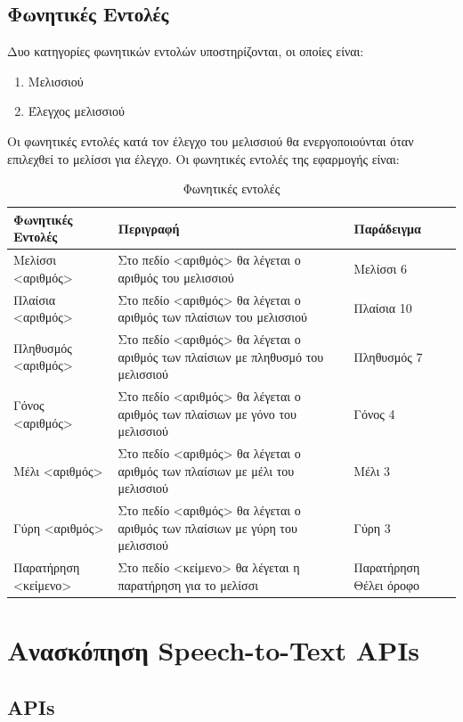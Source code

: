 \documentclass[oneside, 12pt]{book}
\begin{document}
\section{Φωνητικές Εντολές}
\label{sec:φωνητικές-εντολές}
Δυο κατηγορίες φωνητικών εντολών υποστηρίζονται, οι οποίες είναι:
\begin{enumerate}
  \item Μελισσιού
  \item Έλεγχος μελισσιού
\end{enumerate}
Οι φωνητικές εντολές κατά τον έλεγχο του μελισσιού θα ενεργοποιούνται όταν επιλεχθεί το μελίσσι για έλεγχο.
Οι φωνητικές εντολές της εφαρμογής είναι:
\begin{table}[h]
  \centering
  \caption{Φωνητικές εντολές}
  \begin{tabularx}{\linewidth}[h]{|X|X|X|}
    \hline
    Φωνητικές Εντολές & Περιγραφή & Παράδειγμα \\
    \hline
    \hline
    Μελίσσι <αριθμός> & Στο πεδίο <αριθμός> θα λέγεται ο αριθμός του μελισσιού & Μελίσσι 6 \\
    \hline
    Πλαίσια <αριθμός> & Στο πεδίο <αριθμός> θα λέγεται ο αριθμός των πλαίσιων του μελισσιού & Πλαίσια 10 \\
    \hline
    Πληθυσμός <αριθμός> & Στο πεδίο <αριθμός> θα λέγεται ο αριθμός των πλαίσιων με πληθυσμό του μελισσιού & Πληθυσμός 7 \\
    \hline
    Γόνος <αριθμός> & Στο πεδίο <αριθμός> θα λέγεται ο αριθμός των πλαίσιων με γόνο του μελισσιού & Γόνος 4 \\
    \hline
    Μέλι <αριθμός> & Στο πεδίο <αριθμός> θα λέγεται ο αριθμός των πλαίσιων με μέλι του μελισσιού & Μέλι 3 \\
    \hline
    Γύρη <αριθμός> & Στο πεδίο <αριθμός> θα λέγεται ο αριθμός των πλαίσιων με γύρη του μελισσιού & Γύρη 3 \\
    \hline
    Παρατήρηση <κείμενο> & Στο πεδίο <κείμενο> θα λέγεται η παρατήρηση για το μελίσσι & Παρατήρηση Θέλει όροφο  \\
    \hline
  \end{tabularx}
  \label{tab:table3}
\end{table}
\chapter{Ανασκόπηση Speech-to-Text APIs}
\label{ch:ανασκόπηση-speech-to-text-apis}
\section{APIs}
\label{sec:apis}
\end{document}
